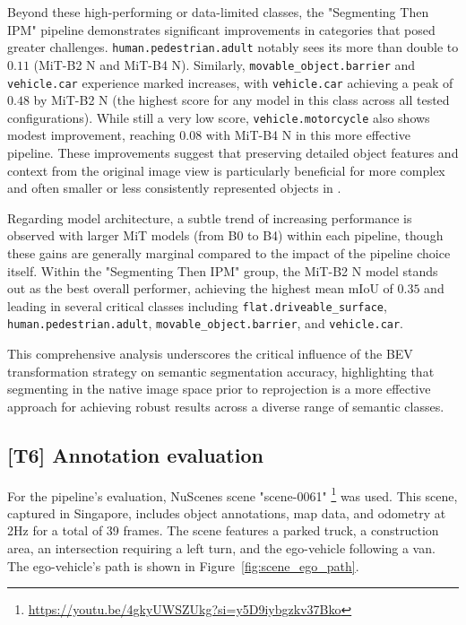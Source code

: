 Beyond these high-performing or data-limited classes, the "Segmenting Then IPM" pipeline demonstrates significant improvements in categories that posed greater challenges. \texttt{human.pedestrian.adult} notably sees its  more than double to $0.11$ (MiT-B2 N and MiT-B4 N). Similarly, \texttt{movable\_object.barrier} and \texttt{vehicle.car} experience marked increases, with \texttt{vehicle.car} achieving a peak of $0.48$ by MiT-B2 N (the highest score for any model in this class across all tested configurations). While still a very low score, \texttt{vehicle.motorcycle} also shows modest improvement, reaching $0.08$ with MiT-B4 N in this more effective pipeline. These improvements suggest that preserving detailed object features and context from the original image view is particularly beneficial for more complex and often smaller or less consistently represented objects in .

Regarding model architecture, a subtle trend of increasing performance is observed with larger MiT models (from B0 to B4) within each pipeline, though these gains are generally marginal compared to the impact of the pipeline choice itself. Within the "Segmenting Then IPM" group, the MiT-B2 N model stands out as the best overall performer, achieving the highest mean mIoU of $0.35$ and leading in several critical classes including \texttt{flat.driveable\_surface}, \texttt{human.pedestrian.adult}, \texttt{movable\_object.barrier}, and \texttt{vehicle.car}. 

This comprehensive analysis underscores the critical influence of the BEV transformation strategy on semantic segmentation accuracy, highlighting that segmenting in the native image space prior to reprojection is a more effective approach for achieving robust results across a diverse range of semantic classes.


\subsection{[T6] Annotation evaluation}
For the pipeline's evaluation, NuScenes scene "scene-0061" \footnote{\url{https://youtu.be/4gkyUWSZUkg?si=y5D9iybgzkv37Bko}} was used. This scene, captured in Singapore, includes object annotations, map data, and odometry at 2Hz for a total of 39 frames. The scene features a parked truck, a construction area, an intersection requiring a left turn, and the ego-vehicle following a van. The ego-vehicle's path is shown in Figure~\ref{fig:scene_ego_path}.


